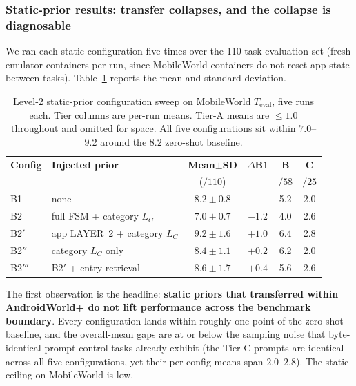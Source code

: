 \subsubsection{Static-prior results: transfer collapses, and the collapse is
diagnosable}
\label{sec:exp-cross-static}

We ran each static configuration five times over the 110-task evaluation set
(fresh emulator containers per run, since MobileWorld containers do not reset
app state between tasks). Table~\ref{tab:mw-static} reports the mean and standard
deviation.

\begin{table}[t]
\small
\centering
\begin{tabular}{llcccc}
\hline
\textbf{Config} & \textbf{Injected prior} & \textbf{Mean$\pm$SD} & \textbf{$\Delta$B1} & \textbf{B} & \textbf{C} \\
                &                          & ($/110$)            &                     & \tiny$/58$ & \tiny$/25$ \\
\hline
B1     & none                          & $8.2\pm0.8$ & ---     & 5.2 & 2.0 \\
B2     & full FSM + category $L_C$     & $7.0\pm0.7$ & $-1.2$  & 4.0 & 2.6 \\
B2$'$  & app LAYER~2 + category $L_C$  & $\mathbf{9.2\pm1.6}$ & $\mathbf{+1.0}$ & 6.4 & 2.8 \\
B2$''$ & category $L_C$ only           & $8.4\pm1.1$ & $+0.2$  & 6.2 & 2.0 \\
B2$'''$& B2$'$ + entry retrieval       & $8.6\pm1.7$ & $+0.4$  & 5.6 & 2.6 \\
\hline
\end{tabular}
\caption{Level-2 static-prior configuration sweep on MobileWorld
$T_{\text{eval}}$, five runs each. Tier columns are per-run means. Tier-A means
are $\le 1.0$ throughout and omitted for space. All five configurations sit
within $7.0$--$9.2$ around the $8.2$ zero-shot baseline.}
\label{tab:mw-static}
\end{table}

The first observation is the headline: \textbf{static priors that transferred
within AndroidWorld+ do not lift performance across the benchmark boundary}.
Every configuration lands within roughly one point of the zero-shot baseline,
and the overall-mean gaps are at or below the sampling noise that
byte-identical-prompt control tasks already exhibit (the Tier-C prompts are
identical across all five configurations, yet their per-config means span
$2.0$--$2.8$). The static ceiling on MobileWorld is low.

